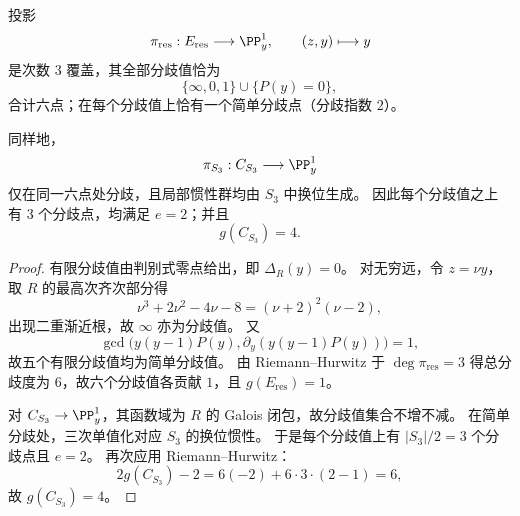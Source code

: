 \begin{conclusion}[六点同型分歧定律与换位惯性]\label{con:cdim-s4-v4-six-branch-transposition}
投影
\[
\pi_{\mathrm{res}}:E_{\mathrm{res}}\longrightarrow \PP^1_y,\qquad (z,y)\longmapsto y
\]
是次数 \(3\) 覆盖，其全部分歧值恰为
\[
\{\infty,0,1\}\cup\{P(y)=0\},
\]
合计六点；在每个分歧值上恰有一个简单分歧点（分歧指数 \(2\)）。

同样地，
\[
\pi_{S_3}:C_{S_3}\longrightarrow \PP^1_y
\]
仅在同一六点处分歧，且局部惯性群均由 \(S_3\) 中换位生成。
因此每个分歧值之上有 \(3\) 个分歧点，均满足 \(e=2\)；并且
\[
g(C_{S_3})=4.
\]
\end{conclusion}
\begin{proof}
有限分歧值由判别式零点给出，即 \(\Delta_R(y)=0\)。
对无穷远，令 \(z=\nu y\)，取 \(R\) 的最高次齐次部分得
\[
\nu^{3}+2\nu^{2}-4\nu-8=(\nu+2)^{2}(\nu-2),
\]
出现二重渐近根，故 \(\infty\) 亦为分歧值。
又
\[
\gcd\!\bigl(y(y-1)P(y),\partial_y(y(y-1)P(y))\bigr)=1,
\]
故五个有限分歧值均为简单分歧值。
由 Riemann--Hurwitz 于 \(\deg \pi_{\mathrm{res}}=3\) 得总分歧度为 \(6\)，故六个分歧值各贡献 \(1\)，且 \(g(E_{\mathrm{res}})=1\)。

对 \(C_{S_3}\to\PP^1_y\)，其函数域为 \(R\) 的 Galois 闭包，故分歧值集合不增不减。
在简单分歧处，三次单值化对应 \(S_3\) 的换位惯性。
于是每个分歧值上有 \(|S_3|/2=3\) 个分歧点且 \(e=2\)。
再次应用 Riemann--Hurwitz：
\[
2g(C_{S_3})-2=6(-2)+6\cdot 3\cdot(2-1)=6,
\]
故 \(g(C_{S_3})=4\)。
\end{proof}

